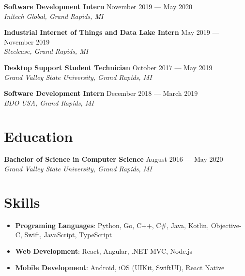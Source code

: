 \documentclass{article}
\begin{document}
\textbf{Software Development Intern} \hfill November 2019 --- May 2020\\
\textit{Initech Global, Grand Rapids, MI}
\medskip


\textbf{Industrial Internet of Things and Data Lake Intern}
\hfill May 2019 --- November 2019\\
\textit{Steelcase, Grand Rapids, MI}
\medskip


\textbf{Desktop Support Student Technician} \hfill October 2017 --- May 2019\\
\textit{Grand Valley State University, Grand Rapids, MI}
\medskip

\textbf{Software Development Intern} \hfill December 2018 --- March 2019\\
\textit{BDO USA, Grand Rapids, MI}
\medskip


\section*{Education}
\textbf{Bachelor of Science in Computer Science} \hfill August 2016 --- May 2020\\
\textit{Grand Valley State University, Grand Rapids, MI}

\section*{Skills}
\begin{itemize}
\item \textbf{Programing Languages}: Python, Go, C++, C\#, Java, Kotlin, Objective-C, Swift, JavaScript, TypeScript
\item \textbf{Web Development}: React, Angular, .NET MVC, Node.js
\item \textbf{Mobile Development}: Android, iOS (UIKit, SwiftUI), React Native
\end{itemize}
\end{document}
